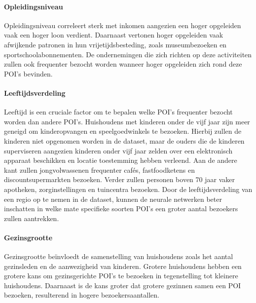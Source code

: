 \paragraph{Opleidingsniveau}
Opleidingsniveau correleert sterk met inkomen aangezien een hoger opgeleiden vaak een hoger loon verdient. Daarnaast vertonen hoger opgeleiden vaak afwijkende patronen in hun vrijetijdsbesteding, zoals museumbezoeken en sportschoolabonnementen. De ondernemingen die zich richten op deze activiteiten zullen ook frequenter bezocht worden wanneer hoger opgeleiden zich rond deze POI’s bevinden.

\paragraph{Leeftijdsverdeling}
Leeftijd is een cruciale factor om te bepalen welke POI’s frequenter bezocht worden dan andere POI’s. Huishoudens met kinderen onder de vijf jaar zijn meer geneigd om kinderopvangen en speelgoedwinkels te bezoeken. Hierbij zullen de kinderen niet opgenomen worden in de dataset, maar de ouders die de kinderen superviseren aangezien kinderen onder vijf jaar zelden over een elektronisch apparaat beschikken en locatie toestemming hebben verleend. Aan de andere kant zullen jongvolwassenen frequenter cafés, fastfoodketens en discountsupermarkten bezoeken. Verder zullen personen boven 70 jaar vaker apotheken, zorginstellingen en tuincentra bezoeken. Door de leeftijdsverdeling van een regio op te nemen in de dataset, kunnen de neurale netwerken beter inschatten in welke mate specifieke soorten POI’s een groter aantal bezoekers zullen aantrekken.

\paragraph{Gezinsgrootte}
Gezinsgrootte beïnvloedt de samenstelling van huishoudens zoals het aantal gezinsleden en de aanwezigheid van kinderen. Grotere huishoudens hebben een grotere kans om gezinsgerichte POI’s te bezoeken in tegenstelling tot kleinere huishoudens. Daarnaast is de kans groter dat grotere gezinnen samen een POI bezoeken, resulterend in hogere bezoekersaantallen.

